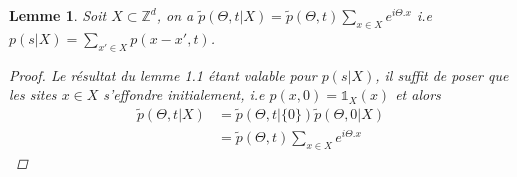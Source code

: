 \documentclass{article}
\newtheorem{lemma}[theorem]{Lemme}
\begin{document}
\begin{lemma}
	Soit $X\subset \mathbb{Z}^d$, on a $\tilde{p}(\Theta, t|X) = \tilde{p}(\Theta, t)\sum_{x\in X}e^{i\Theta.x}$ i.e $p(s|X)=\sum_{x'\in X}p(x-x',t)$.
	\begin{proof}
		Le résultat du lemme 1.1 étant valable pour $p(s|X)$, il suffit de poser que les sites $x\in X$ s'effondre initialement, i.e $p(x,0) = \mathds{1}_X(x)$ et alors \begin{align*}
			\tilde{p}(\Theta, t|X)&=\tilde{p}(\Theta,t|\{0\})\tilde{p}(\Theta,0|X)\\
					      &=\tilde{p}(\Theta, t)\sum_{x\in X}e^{i\Theta.x}
		\end{align*}
	\end{proof}
\end{lemma}
\end{document}
